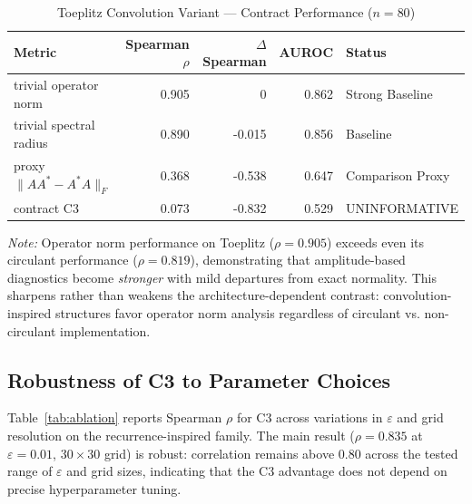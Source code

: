 \documentclass[twoside]{article}
\begin{document}
\begin{table}[H]
\caption{Toeplitz Convolution Variant — Contract Performance ($n=80$)}
\label{tab:toeplitz}
\centering
\begin{tabular}{lrrrl}
\toprule
Metric & Spearman $\rho$ & $\Delta$Spearman & AUROC & Status \\
\midrule
trivial operator norm  & 0.905 & 0 & 0.862 & Strong Baseline \\
trivial spectral radius & 0.890 & -0.015 & 0.856 & Baseline \\
proxy $\|AA^*-A^*A\|_F$ & 0.368 & -0.538 & 0.647 & Comparison Proxy \\
contract C3 & 0.073 & -0.832 & 0.529 & UNINFORMATIVE \\
\bottomrule
\end{tabular}
\par\smallskip
{\footnotesize \textit{Note:} Operator norm performance on Toeplitz ($\rho=0.905$) exceeds even its circulant performance ($\rho=0.819$), demonstrating that amplitude-based diagnostics become \emph{stronger} with mild departures from exact normality. This sharpens rather than weakens the architecture-dependent contrast: convolution-inspired structures favor operator norm analysis regardless of circulant vs. non-circulant implementation.}
\end{table}

\subsection{Robustness of C3 to Parameter Choices}
\label{sec:ablation}

Table~\ref{tab:ablation} reports Spearman $\rho$ for C3 across variations in $\varepsilon$ and grid resolution on the recurrence-inspired family. The main result ($\rho = 0.835$ at $\varepsilon=0.01$, $30\times30$ grid) is robust: correlation remains above 0.80 across the tested range of $\varepsilon$ and grid sizes, indicating that the C3 advantage does not depend on precise hyperparameter tuning.
\end{document}

